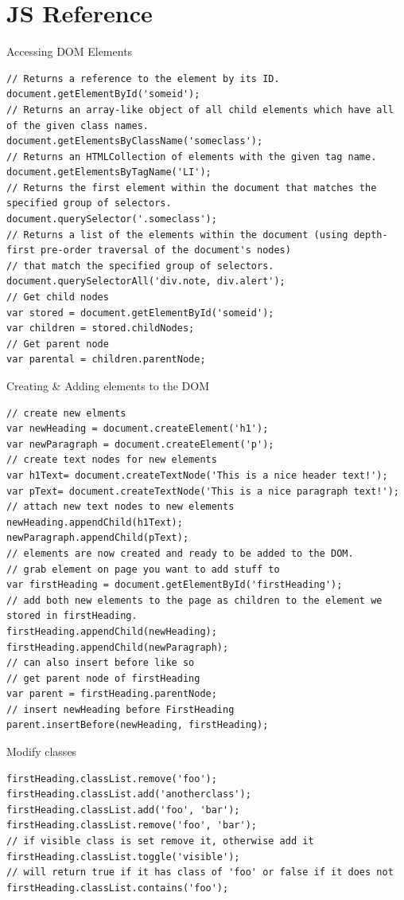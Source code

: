 \documentclass[11pt]{article}
\begin{document}
\section{JS Reference}
\label{sec:org11f8d6d}
Accessing DOM Elements
\lstset{breaklines=true,language=javascript,label= ,caption= ,captionpos=b,numbers=none}
\begin{lstlisting}
// Returns a reference to the element by its ID.
document.getElementById('someid');
// Returns an array-like object of all child elements which have all of the given class names.
document.getElementsByClassName('someclass');
// Returns an HTMLCollection of elements with the given tag name.
document.getElementsByTagName('LI');
// Returns the first element within the document that matches the specified group of selectors.
document.querySelector('.someclass');
// Returns a list of the elements within the document (using depth-first pre-order traversal of the document's nodes)
// that match the specified group of selectors.
document.querySelectorAll('div.note, div.alert');
// Get child nodes
var stored = document.getElementById('someid');
var children = stored.childNodes;
// Get parent node
var parental = children.parentNode;
\end{lstlisting}
Creating \& Adding elements to the DOM
\lstset{breaklines=true,language=javascript,label= ,caption= ,captionpos=b,numbers=none}
\begin{lstlisting}
// create new elments
var newHeading = document.createElement('h1');
var newParagraph = document.createElement('p');
// create text nodes for new elements
var h1Text= document.createTextNode('This is a nice header text!');
var pText= document.createTextNode('This is a nice paragraph text!');
// attach new text nodes to new elements
newHeading.appendChild(h1Text);
newParagraph.appendChild(pText);
// elements are now created and ready to be added to the DOM.
// grab element on page you want to add stuff to
var firstHeading = document.getElementById('firstHeading');
// add both new elements to the page as children to the element we stored in firstHeading.
firstHeading.appendChild(newHeading);
firstHeading.appendChild(newParagraph);
// can also insert before like so
// get parent node of firstHeading
var parent = firstHeading.parentNode;
// insert newHeading before FirstHeading
parent.insertBefore(newHeading, firstHeading);
\end{lstlisting}
Modify classes
\lstset{breaklines=true,language=javascript,label= ,caption= ,captionpos=b,numbers=none}
\begin{lstlisting}
firstHeading.classList.remove('foo');
firstHeading.classList.add('anotherclass');
firstHeading.classList.add('foo', 'bar');
firstHeading.classList.remove('foo', 'bar');
// if visible class is set remove it, otherwise add it
firstHeading.classList.toggle('visible');
// will return true if it has class of 'foo' or false if it does not
firstHeading.classList.contains('foo');
\end{lstlisting}
\end{document}
